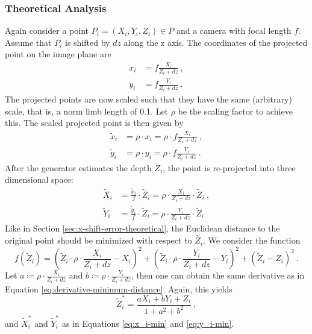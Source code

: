 \subsubsection{Theoretical Analysis}
Again consider a point $P_i=(X_i, Y_i, Z_i) \in P$ and a camera with focal length $f$. Assume that $P_i$ is shifted by $dz$ along the z axis.
The coordinates of the projected point on the image plane are
\begin{align}
	x_i &= f \frac{X_i}{Z_i + dz} \ , \\
	y_i &= f \frac{Y_i}{Z_i + dz} \ .
\end{align}
The projected points are now scaled such that they have the same (arbitrary) scale, that is, a norm limb length of 0.1.
Let $\rho$ be the scaling factor to achieve this.
The scaled projected point is then given by
\begin{align}
		\widetilde{x}_i &= \rho \cdot x_i 
		= \rho \cdot f \frac{X_i}{Z_i + dz} \ , \\
		\widetilde{y}_i &= \rho \cdot y_i
		= \rho \cdot f \frac{Y_i}{Z_i + dz} \ .
\end{align}
After the generator estimates the depth $\widetilde{Z}_i$, the point is re-projected into three dimensional space:
\begin{align}
	\widetilde{X}_i &= \frac{\widetilde{x}_i}{f} \cdot \widetilde{Z}_i
	= \rho \cdot \frac{X_i}{Z_i + dz} \cdot \widetilde{Z}_i \ , \\
	\widetilde{Y}_i &= \frac{\widetilde{y}_i}{f} \cdot \widetilde{Z}_i
	= \rho \cdot \frac{Y_i}{Z_i + dz}\cdot \widetilde{Z}_i
\end{align}
Like in Section \ref{sec:x-shift-error-theoretical}, the Euclidean distance to the original point should be minimized with respect to $\widetilde{Z_i}$.
We consider the function
\begin{equation}
	f(\widetilde{Z}_i) = \left ( \widetilde{Z}_i \cdot \rho  \cdot \frac{X_i}{Z_i + dz}- X_i \right)^2 + 
					\left ( \widetilde{Z}_i \cdot \rho \cdot \frac{Y_i}{Z_i + dz} - Y_i \right)^2
					 + \left ( \widetilde{Z}_i - Z_i \right)^2 \ .
\end{equation}
Let $a \coloneqq \rho \cdot \frac{X_i}{Z_i + dz}$ and $b \coloneqq \rho \cdot \frac{Y_i}{Z_i + dz}$, then one can obtain the same derivative as in Equation \eqref{eq:derivative-minimum-distance}.
Again, this yields
\begin{equation}
	\widetilde{Z}_i^\ast = \frac{a X_i + b Y_i + Z_i}{1 + a^2 + b^2} \ ,
\end{equation}
and $\widetilde{X}_i^\ast$ and $\widetilde{Y}_i^\ast$ as in Equations \eqref{eq:x_i-min} and \eqref{eq:y_i-min}.
